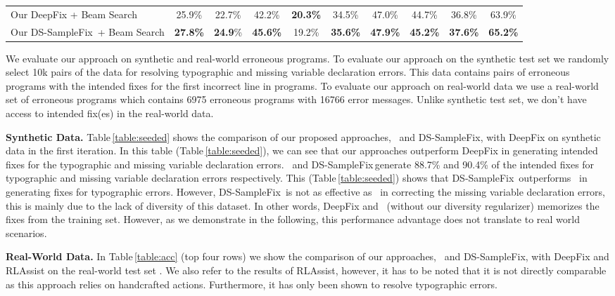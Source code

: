 \documentclass[letterpaper]{article} \usepackage{aaai20}  \usepackage{times}  \usepackage{helvet} \usepackage{courier}  \usepackage[hyphens]{url}  \usepackage{graphicx}
\newcommand{\dssmaplefix}{DS-SampleFix}
\newcommand{\tableref}{Table}
\newcommand{\myparagraph}[1]{\vspace{0.0em}\noindent\textbf{#1.}}
\begin{document}
\begin{table*}[t]
\begin{center}
\begin{tabular}{lccccccccc}
\midrule
Our DeepFix + Beam Search &  25.9\%        &    22.7\%    &   42.2\%     &   \textbf{20.3\%}       &  34.5\%        &    47.0\%     &   44.7\%     &  36.8\%      &  63.9\% \\
Our \dssmaplefix \, + Beam Search & \textbf{27.8\%}        &    \textbf{24.9}\%    &   \textbf{45.6\%}     &   19.2\%       &  \textbf{35.6\%}        &    \textbf{47.9\%}     &   \textbf{45.2\%}     &  \textbf{37.6\%}      &  \textbf{65.2\%} 
\\\bottomrule
\end{tabular}




\end{center}
\end{table*}
We evaluate our approach on synthetic and real-world erroneous programs. To evaluate our approach on the synthetic test set we randomly select 10k pairs of the data for resolving typographic and missing variable declaration errors. This data contains pairs of erroneous programs with the intended fixes for the first incorrect line in programs. To evaluate our approach on real-world data we use a real-world set of erroneous programs which contains 6975 erroneous programs with 16766 error messages. Unlike synthetic test set, we don't have access to intended fix(es) in the real-world data.

\myparagraph{Synthetic Data} 
\tableref \,\ref{table:seeded} shows the comparison of our proposed approaches, \samplefix \, and \dssmaplefix, with DeepFix \cite{Gupta2017DeepFixFC} on synthetic data in the first iteration. In this table (\tableref \,\ref{table:seeded}), we can see that our approaches outperform DeepFix in generating intended fixes for the typographic and missing variable declaration errors. \samplefix \, and \dssmaplefix \,generate 88.7\% and 90.4\% of the intended fixes for typographic and missing variable declaration errors respectively. This (\tableref \,\ref{table:seeded}) shows that \dssmaplefix\, outperforms \samplefix\, in generating fixes for typographic errors. However, \dssmaplefix\, is not as effective as \samplefix\, in correcting the missing variable declaration errors, this is mainly due to the lack of diversity of this dataset. In other words, DeepFix and \samplefix \, (without our diversity regularizer) memorizes the fixes from the training set. However, as we demonstrate in the following, this performance advantage does not translate to real world scenarios.




\myparagraph{Real-World Data} In \tableref \,\ref{table:acc} (top four rows) we show the comparison of our approaches, \samplefix \, and \dssmaplefix, with DeepFix \cite{Gupta2017DeepFixFC} and RLAssist \cite{gupta2019RLAssist} on the real-world test set . We also refer to the results of RLAssist, however, it has to be noted that it is not directly comparable as this approach relies on handcrafted actions. Furthermore, it has only been shown to resolve typographic errors.  
\end{document}
